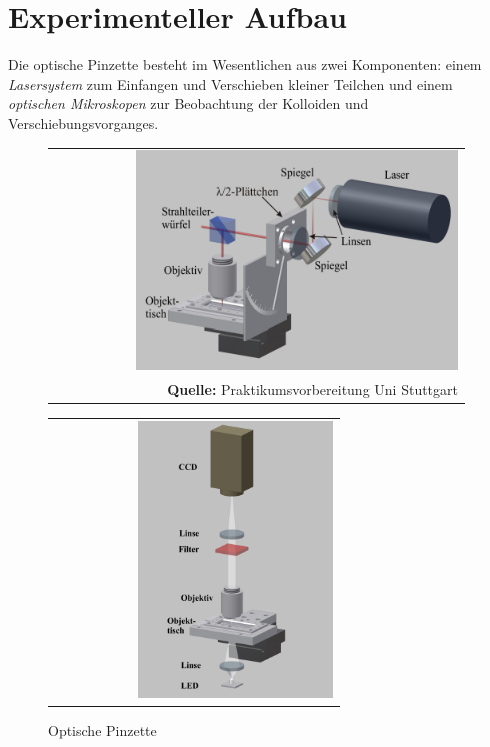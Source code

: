 \documentclass[a4paper,titlepage]{scrartcl}
\numberwithin{equation}{section}
\begin{document}
\section{Experimenteller Aufbau}
Die optische Pinzette besteht im Wesentlichen aus zwei Komponenten: einem \emph{Lasersystem} zum Einfangen und Verschieben kleiner Teilchen und einem \emph{optischen Mikroskopen} zur Beobachtung der Kolloiden und Verschiebungsvorganges.
\begin{figure}[H]
\begin{minipage}{.5\textwidth}
\centering
\begin{tabular}{@{}r@{}}
\includegraphics[width=0.8\textwidth]{pinzette.PNG}\\
\footnotesize\sffamily\textbf{Quelle:} Praktikumsvorbereitung Uni Stuttgart \cite{praktikum}
\end{tabular}
\caption{Optische Pinzette}
\label{fig:pinzette}
\end{minipage}
\begin{minipage}{.5\textwidth}
\centering
\begin{tabular}{@{}r@{}}
\includegraphics[width=0.7\textwidth]{mikroskop.PNG}\\

\end{tabular}
\end{minipage}
\end{figure}
\end{document}
